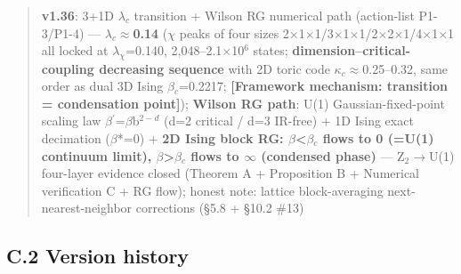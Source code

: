 \documentclass[12pt]{article}
\newcommand{\mtag}[1]{\textbf{[#1]}}
\newcommand{\up}[1]{\ensuremath{^{#1}}}
\newcommand{\down}[1]{\ensuremath{_{#1}}}
\begin{document}
\begin{quote}
\textbf{v1.36}: 3+1D \ensuremath{\lambda}\down{c} transition + Wilson RG numerical path (action-list P1-3/P1-4) --- \textbf{\ensuremath{\lambda}\down{c}\ensuremath{\approx}0.14} (\ensuremath{\chi} peaks of four sizes 2\ensuremath{\times}1\ensuremath{\times}1/3\ensuremath{\times}1\ensuremath{\times}1/2\ensuremath{\times}2\ensuremath{\times}1/4\ensuremath{\times}1\ensuremath{\times}1 all locked at \ensuremath{\lambda}\down{\chi{}}=0.140, 2,048--2.1\ensuremath{\times}10\up{6} states; \textbf{dimension--critical-coupling decreasing sequence} with 2D toric code \ensuremath{\kappa}\down{c}\ensuremath{\approx}0.25--0.32, same order as dual 3D Ising \ensuremath{\beta}\down{c}=0.2217; \mtag{Framework mechanism: transition = condensation point}); \textbf{Wilson RG path}: U(1) Gaussian-fixed-point scaling law \ensuremath{\beta}\ensuremath{^\prime}=\ensuremath{\beta}b\up{2-d} (d=2 critical / d=3 IR-free) + 1D Ising exact decimation (\ensuremath{\beta}*=0) + \textbf{2D Ising block RG: \ensuremath{\beta}<\ensuremath{\beta}\down{c} flows to 0 (=U(1) continuum limit), \ensuremath{\beta}>\ensuremath{\beta}\down{c} flows to \ensuremath{\infty} (condensed phase)} --- Z\down{2}\ensuremath{\to}U(1) four-layer evidence closed (Theorem A + Proposition B + Numerical verification C + RG flow); honest note: lattice block-averaging next-nearest-neighbor corrections (\S{}5.8 + \S{}10.2 \#13)
\end{quote}

\subsection*{C.2 Version history}
\end{document}
